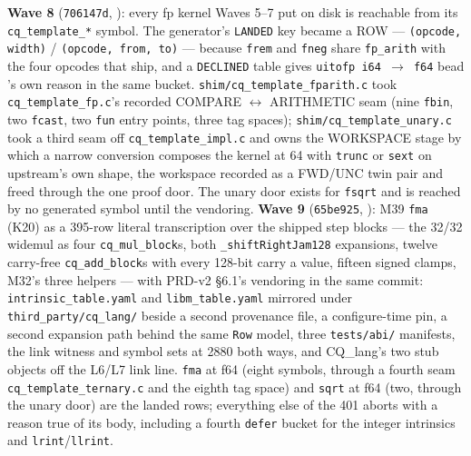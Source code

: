 \textbf{Wave 8} (\texttt{706147d}, ): every fp kernel Waves 5--7 put on disk is reachable
from its \texttt{cq\_template\_*} symbol. The generator's \texttt{LANDED} key became a ROW ---
\texttt{(opcode, width)} / \texttt{(opcode, from, to)} --- because \texttt{frem} and \texttt{fneg} share
\texttt{fp\_arith} with the four opcodes that ship, and a \texttt{DECLINED} table gives \texttt{uitofp i64
$\to$ f64} bead 's own reason in the same bucket. \texttt{shim/cq\_template\_fparith.c} took
\texttt{cq\_template\_fp.c}'s recorded COMPARE $\leftrightarrow$ ARITHMETIC seam (nine \texttt{fbin}, two
\texttt{fcast}, two \texttt{fun} entry points, three tag spaces); \texttt{shim/cq\_template\_unary.c} took a
third seam off \texttt{cq\_template\_impl.c} and owns the WORKSPACE stage by which a narrow conversion
composes the kernel at 64 with \texttt{trunc} or \texttt{sext} on upstream's own shape, the workspace recorded
as a FWD/UNC twin pair and freed through the one proof door. The unary door exists for \texttt{fsqrt} and is
reached by no generated symbol until the vendoring. \textbf{Wave 9} (\texttt{65be925}, ): M39
\texttt{fma} (K20) as a 395-row literal transcription over the shipped step blocks --- the 32/32 widemul as
four \texttt{cq\_mul\_block}s, both \texttt{\_shiftRightJam128} expansions, twelve carry-free
\texttt{cq\_add\_block}s with every 128-bit carry a value, fifteen signed clamps, M32's three helpers ---
with PRD-v2 \S6.1's vendoring in the same commit: \texttt{intrinsic\_table.yaml} and \texttt{libm\_table.yaml}
mirrored under \texttt{third\_party/cq\_lang/} beside a second provenance file, a configure-time pin, a
second expansion path behind the same \texttt{Row} model, three \texttt{tests/abi/} manifests, the link
witness and symbol sets at 2880 both ways, and CQ\_lang's two stub objects off the L6/L7 link line.
\texttt{fma} at f64 (eight symbols, through a fourth seam \texttt{cq\_template\_ternary.c} and the eighth tag
space) and \texttt{sqrt} at f64 (two, through the unary door) are the landed rows; everything else of the
401 aborts with a reason true of its body, including a fourth \texttt{defer} bucket for the integer
intrinsics and \texttt{lrint}/\texttt{llrint}.

